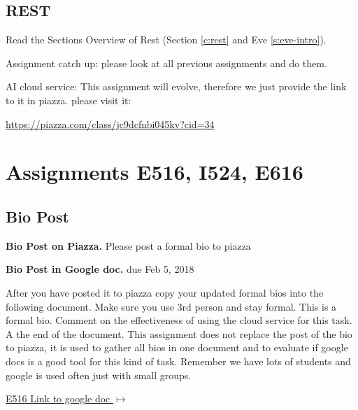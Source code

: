 \subsection{REST}
\begin{exercise}
Read the Sections Overview of Rest (Section \ref{c:rest} and Eve \ref{s:eve-intro}).
\end{exercise}

\begin{exercise}
Assignment catch up: please look at all previous assignments and do
them. 
\end{exercise}

\begin{exercise}

AI cloud service: This assignment will evolve, therefore we just
provide the link to it in piazza. please visit it:

\url{https://piazza.com/class/jc9dcfnbi045kv?cid=34}
\end{exercise}

\section{Assignments E516, I524, E616}
\label{s:616-assignments}

\subsection{Bio Post}\label{a:616-bio}

\begin{exercise}\label{E:616-bio-piazza}
{\bf Bio Post on Piazza.} Please post a formal bio to piazza
\end{exercise}

\begin{exercise} \label{E:616-bio-googledocs}

  {\bf Bio Post in Google doc.} due Feb 5, 2018
  
  After you have posted it to piazza
  copy your updated formal bios into the following document.  Make
  sure you use 3rd person and stay formal. This is a formal
  bio. Comment on the effectiveness of using the cloud service for
  this task. A the end of the document. This assignment does not
  replace the post of the bio to piazza, it is used to gather all bios
  in one document and to evaluate if google docs is a good tool for
  this kind of task. Remember we have lots of students and google is
  used often just with small groups.
 
 \smallskip

 {\hfill \href{https://docs.google.com/document/d/1ejzlKYqC3dLac8WXVpcPQsJh1j4BDqRxxgGg1cFQbeQ/edit?usp=sharing}{E516 Link to google doc $\mapsto$}}

 \end{exercise}

